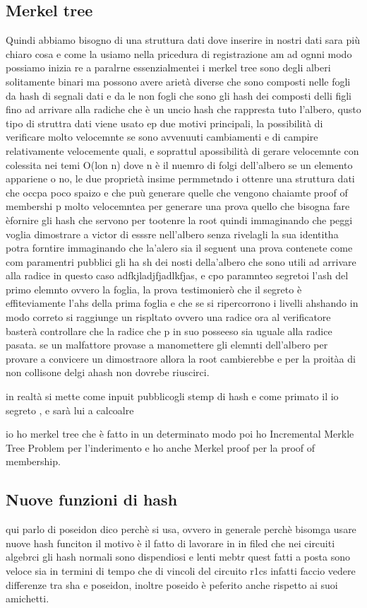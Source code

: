 \subsection{Merkel tree}
Quindi abbiamo bisogno di una struttura dati dove inserire in nostri dati sara più chiaro cosa e come la usiamo nella
pricedura di registrazione am ad ognni modo possiamo inizia re a paralrne essenzialmentei i merkel tree sono degli
alberi solitamente binari ma possono avere arietà diverse che sono composti nelle fogli da hash di segnali dati e da le
non fogli che sono gli hash dei composti delli figli fino ad arrivare alla radiche che è un uncio hash che rappresta
tuto l'albero, qusto tipo di struttra dati viene usato ep due motivi principali, la possibilità di verificare molto
velocemnte se sono avvenuuti cambiamenti e di campire relativamente velocemente quali, e soprattul apossibilità di
gerare velocemnte con colessita nei temi O(lon n) dove n è il nuemro di folgi dell'albero se un elemento appariene o no,
le due proprietà insime permmetndo i ottenre una struttura dati che occpa poco spaizo e che puù generare quelle che
vengono chaiamte proof of membershi p molto velocemntea per generare una prova quello che bisogna fare èfornire gli hash
che servono per tootenre la root quindi immaginando che peggi voglia dimostrare a victor di esssre nell'albero senza
rivelagli la sua identitha potra forntire immaginando che la'alero sia il seguent una prova contenete come com
paramentri pubblici gli ha sh dei nosti della'albero che sono utili ad arrivare alla radice in questo caso
adfkjladjfjadlkfjas, e cpo  paramnteo segretoi l'ash del primo elemnto ovvero la foglia, la prova testimonierò che il
segreto è effiteviamente l'ahs della prima foglia e che se si ripercorrono i livelli ahshando in modo correto si
raggiunge un rispltato ovvero una radice ora al verificatore basterà controllare che la radice che p in suo posseeso sia
uguale alla radice pasata. se un malfattore provase a manomettere gli elemnti dell'albero per provare a convicere un
dimostraore allora la root cambierebbe e per la proitàa di non collisone delgi ahash non dovrebe riuscirci.

in realtà si mette come inpuit pubblicogli stemp di hash  e come primato il io segreto , e sarà lui a calcoalre

io ho merkel tree che è fatto in un determinato modo poi ho Incremental Merkle Tree Problem per l'inderimento e ho anche
Merkel proof per la proof of membership.

\subsection{Nuove funzioni di hash}
qui parlo di poseidon dico perchè si usa, ovvero in generale perchè bisomga usare nuove hash funciton il motivo è il
fatto di lavorare in in filed che nei circuiti algebrci gli hash normali sono dispendiosi e lenti mebtr quest fatti a
posta sono veloce sia in termini di tempo che di vincoli del circuito r1cs infatti faccio vedere differenze tra sha e
poseidon, inoltre poseido è peferito anche rispetto ai suoi amichetti.

